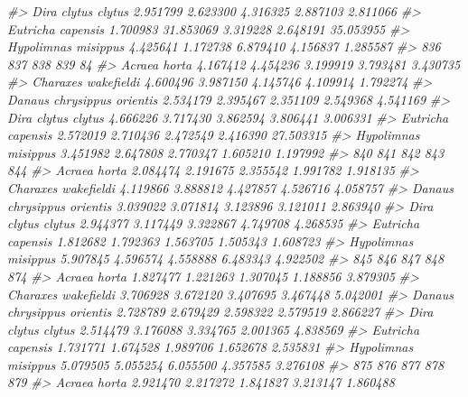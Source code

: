 \documentclass[
]{article}
\newenvironment{Shaded}{\begin{snugshade}}{\end{snugshade}}
\newcommand{\CommentTok}[1]{\textcolor[rgb]{0.56,0.35,0.01}{\textit{#1}}}
\begin{document}
\begin{Shaded}
\begin{Highlighting}[]
\CommentTok{\#\textgreater{} Dira clytus clytus         2.951799  2.623300 4.316325 2.887103  2.811066}
\CommentTok{\#\textgreater{} Eutricha capensis          1.700983 31.853069 3.319228 2.648191 35.053955}
\CommentTok{\#\textgreater{} Hypolimnas misippus        4.425641  1.172738 6.879410 4.156837  1.285587}
\CommentTok{\#\textgreater{}                                 836      837      838      839        84}
\CommentTok{\#\textgreater{} Acraea horta               4.167412 4.454236 3.199919 3.793481  3.430735}
\CommentTok{\#\textgreater{} Charaxes wakefieldi        4.600496 3.987150 4.145746 4.109914  1.792274}
\CommentTok{\#\textgreater{} Danaus chrysippus orientis 2.534179 2.395467 2.351109 2.549368  4.541169}
\CommentTok{\#\textgreater{} Dira clytus clytus         4.666226 3.717430 3.862594 3.806441  3.006331}
\CommentTok{\#\textgreater{} Eutricha capensis          2.572019 2.710436 2.472549 2.416390 27.503315}
\CommentTok{\#\textgreater{} Hypolimnas misippus        3.451982 2.647808 2.770347 1.605210  1.197992}
\CommentTok{\#\textgreater{}                                 840      841      842      843      844}
\CommentTok{\#\textgreater{} Acraea horta               2.084474 2.191675 2.355542 1.991782 1.918135}
\CommentTok{\#\textgreater{} Charaxes wakefieldi        4.119866 3.888812 4.427857 4.526716 4.058757}
\CommentTok{\#\textgreater{} Danaus chrysippus orientis 3.039022 3.071814 3.123896 3.121011 2.863940}
\CommentTok{\#\textgreater{} Dira clytus clytus         2.944377 3.117449 3.322867 4.749708 4.268535}
\CommentTok{\#\textgreater{} Eutricha capensis          1.812682 1.792363 1.563705 1.505343 1.608723}
\CommentTok{\#\textgreater{} Hypolimnas misippus        5.907845 4.596574 4.558888 6.483343 4.922502}
\CommentTok{\#\textgreater{}                                 845      846      847      848      874}
\CommentTok{\#\textgreater{} Acraea horta               1.827477 1.221263 1.307045 1.188856 3.879305}
\CommentTok{\#\textgreater{} Charaxes wakefieldi        3.706928 3.672120 3.407695 3.467448 5.042001}
\CommentTok{\#\textgreater{} Danaus chrysippus orientis 2.728789 2.679429 2.598322 2.579519 2.866227}
\CommentTok{\#\textgreater{} Dira clytus clytus         2.514479 3.176088 3.334765 2.001365 4.838569}
\CommentTok{\#\textgreater{} Eutricha capensis          1.731771 1.674528 1.989706 1.652678 2.535831}
\CommentTok{\#\textgreater{} Hypolimnas misippus        5.079505 5.055254 6.055500 4.357585 3.276108}
\CommentTok{\#\textgreater{}                                 875      876      877      878      879}
\CommentTok{\#\textgreater{} Acraea horta               2.921470 2.217272 1.841827 3.213147 1.860488}

\end{Highlighting}
\end{Shaded}
\end{document}
